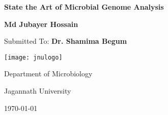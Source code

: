 
\begin{titlepage}	
	\centering 	
	{\LARGE \bfseries State the Art of Microbial Genome Analysis}
	\vspace{3\baselineskip}
	
	{\Huge \bfseries Md Jubayer Hossain}
	\vspace{3\baselineskip}
	
	{\Large Submitted To: \bfseries Dr. Shamima Begum}
	\vspace{3\baselineskip}
	
	\texttt{[image: jnulogo]}
	\vspace{3\baselineskip}
	
	{\Large Department of Microbiology}
	\vspace{0.5\baselineskip}
	
	{\Large Jagannath University}
	\vspace{3\baselineskip}
	
	{\Large \today}    
	
\end{titlepage}		